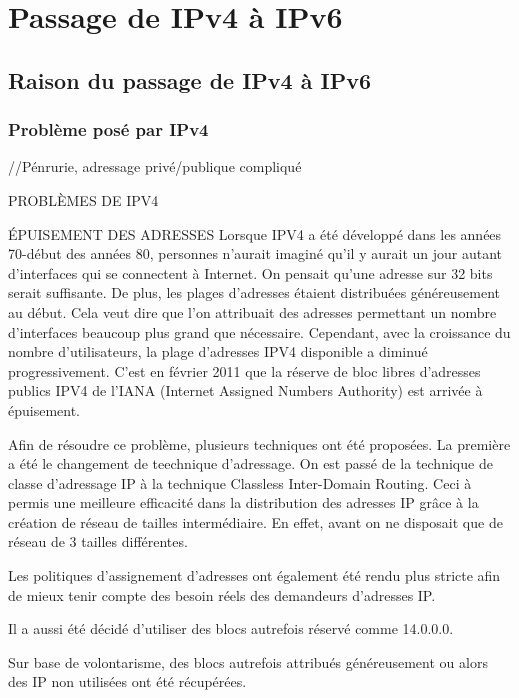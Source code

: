 \section{Passage de IPv4 à IPv6}
\subsection{Raison du passage de IPv4 à IPv6}
\subsubsection{Problème posé par IPv4}
//Pénrurie, adressage privé/publique compliqué

PROBLÈMES DE IPV4

ÉPUISEMENT DES ADRESSES
Lorsque IPV4 a été développé dans les années 70-début des années 80, personnes 
n'aurait imaginé qu'il y aurait un jour autant d'interfaces qui se connectent à
Internet. On pensait qu'une adresse sur 32 bits serait suffisante. De plus, les
plages d'adresses étaient distribuées généreusement au début. Cela veut dire
que l'on attribuait des adresses permettant un nombre d'interfaces beaucoup 
plus grand que nécessaire.
Cependant, avec la croissance du nombre d'utilisateurs, la plage d'adresses
IPV4 disponible a diminué progressivement. C'est en février 2011 que la réserve
de bloc libres d'adresses publics IPV4 de l'IANA (Internet Assigned Numbers 
Authority) est arrivée à épuisement.

Afin de résoudre ce problème, plusieurs techniques ont été proposées.
La première a été le changement de teechnique d'adressage. On est passé de la
technique de classe d'adressage IP à la technique Classless Inter-Domain
Routing. Ceci à permis une meilleure efficacité dans la distribution des
adresses IP grâce à la création de réseau de tailles intermédiaire. En effet,
avant on ne disposait que de réseau de 3 tailles différentes.

Les politiques d'assignement d'adresses ont également été rendu plus stricte
afin de mieux tenir compte des besoin réels des demandeurs d'adresses IP.

Il a aussi été décidé d'utiliser des blocs autrefois réservé comme 14.0.0.0.

Sur base de volontarisme, des blocs autrefois attribués généreusement ou alors
des IP non utilisées ont été récupérées.

